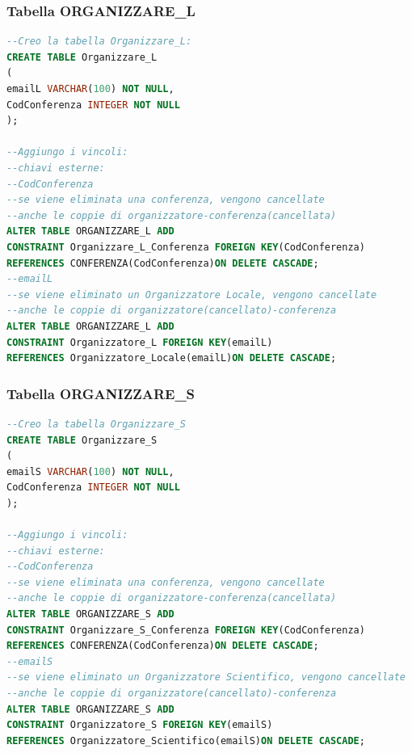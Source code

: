 \documentclass[a4page]{article}
\begin{document}
\subsubsection{Tabella ORGANIZZARE\_L}
\begin{lstlisting}[language=SQL,
        deletekeywords={IDENTITY,INT},
        morekeywords={clustered},    
        framesep=10pt,
        framextopmargin=10pt]
--Creo la tabella Organizzare_L: 
CREATE TABLE Organizzare_L
(
emailL VARCHAR(100) NOT NULL,
CodConferenza INTEGER NOT NULL
);

--Aggiungo i vincoli:
--chiavi esterne:
--CodConferenza
--se viene eliminata una conferenza, vengono cancellate
--anche le coppie di organizzatore-conferenza(cancellata)
ALTER TABLE ORGANIZZARE_L ADD
CONSTRAINT Organizzare_L_Conferenza FOREIGN KEY(CodConferenza)
REFERENCES CONFERENZA(CodConferenza)ON DELETE CASCADE;
--emailL
--se viene eliminato un Organizzatore Locale, vengono cancellate
--anche le coppie di organizzatore(cancellato)-conferenza
ALTER TABLE ORGANIZZARE_L ADD
CONSTRAINT Organizzatore_L FOREIGN KEY(emailL)
REFERENCES Organizzatore_Locale(emailL)ON DELETE CASCADE;        

\end{lstlisting}
\subsubsection{Tabella ORGANIZZARE\_S}
\begin{lstlisting}[language=SQL,
        deletekeywords={IDENTITY,INT},
        morekeywords={clustered},    
        framesep=10pt,
        framextopmargin=10pt]
--Creo la tabella Organizzare_S
CREATE TABLE Organizzare_S
(
emailS VARCHAR(100) NOT NULL,
CodConferenza INTEGER NOT NULL
);

--Aggiungo i vincoli:
--chiavi esterne:
--CodConferenza
--se viene eliminata una conferenza, vengono cancellate
--anche le coppie di organizzatore-conferenza(cancellata)
ALTER TABLE ORGANIZZARE_S ADD
CONSTRAINT Organizzare_S_Conferenza FOREIGN KEY(CodConferenza)
REFERENCES CONFERENZA(CodConferenza)ON DELETE CASCADE;
--emailS
--se viene eliminato un Organizzatore Scientifico, vengono cancellate
--anche le coppie di organizzatore(cancellato)-conferenza
ALTER TABLE ORGANIZZARE_S ADD
CONSTRAINT Organizzatore_S FOREIGN KEY(emailS)
REFERENCES Organizzatore_Scientifico(emailS)ON DELETE CASCADE;
        

\end{lstlisting}
\end{document}
